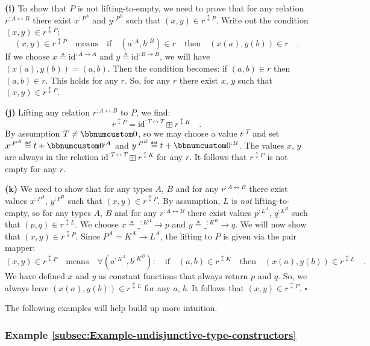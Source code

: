 \textbf{(i)} To show that $P$ is not lifting-to-empty, we need to
prove that for any relation $r^{:A\leftrightarrow B}$ there exist
$x^{:P^{A}}$ and $y^{:P^{B}}$ such that $(x,y)\in r^{\updownarrow P}$.
Write out the condition $(x,y)\in r^{\updownarrow P}$:
\[
(x,y)\in r^{\updownarrow P}\quad\text{means}\quad\text{if}\quad(a^{:A},b^{:B})\in r\quad\text{then}\quad(x(a),y(b))\in r\quad.
\]
If we choose $x\triangleq\text{id}^{:A\rightarrow A}$ and $y\triangleq\text{id}^{:B\rightarrow B}$,
we will have $(x(a),y(b))=(a,b)$. Then the condition becomes: if
$(a,b)\in r$ then $(a,b)\in r$. This holds for any $r$. So, for
any $r$ there exist $x$, $y$ such that $(x,y)\in r^{\updownarrow P}$.

\textbf{(j)} Lifting any relation $r^{:A\leftrightarrow B}$ to $P$,
we find:
\[
r^{\updownarrow P}=\text{id}^{:T\leftrightarrow T}\boxplus r^{\updownarrow K}\quad.
\]
By assumption $T\neq\bbnum 0$, so we may choose a value $t^{:T}$
and set $x^{:P^{A}}\triangleq t+\bbnum 0^{:A}$ and $y^{:P^{B}}\triangleq t+\bbnum 0^{:B}$.
The values $x$, $y$ are always in the relation $\text{id}^{:T\leftrightarrow T}\boxplus r^{\updownarrow K}$
for any $r$. It follows that $r^{\updownarrow P}$ is not empty for
any $r$. 

\textbf{(k)} We need to show that for any types $A$, $B$ and for
any $r^{:A\leftrightarrow B}$ there exist values $x^{:P^{A}}$, $y^{:P^{B}}$
such that $(x,y)\in r^{\updownarrow P}$. By assumption, $L$ is \emph{not}
lifting-to-empty, so for any types $A$, $B$ and for any $r^{:A\leftrightarrow B}$
there exist values $p^{:L^{A}}$, $q^{:L^{B}}$ such that $(p,q)\in r^{\updownarrow L}$.
We choose $x\triangleq\_^{:K^{A}}\rightarrow p$ and $y\triangleq\_^{:K^{B}}\rightarrow q$.
We will now show that $(x,y)\in r^{\updownarrow P}$. Since $P^{A}=K^{A}\rightarrow L^{A}$,
the lifting to $P$ is given via the pair mapper:
\[
(x,y)\in r^{\updownarrow P}\quad\text{means}\quad\forall(a^{:K^{A}},b^{:K^{B}}):\quad\text{if}\quad(a,b)\in r^{\updownarrow K}\quad\text{then}\quad(x(a),y(b))\in r^{\updownarrow L}\quad.
\]
We have defined $x$ and $y$ as constant functions that always return
$p$ and $q$. So, we always have $(x(a),y(b))\in r^{\updownarrow L}$
for any $a$, $b$. It follows that $(x,y)\in r^{\updownarrow P}$.
$\square$

The following examples will help build up more intuition.

\subsubsection{Example \label{subsec:Example-undisjunctive-type-constructors}\ref{subsec:Example-undisjunctive-type-constructors}}

